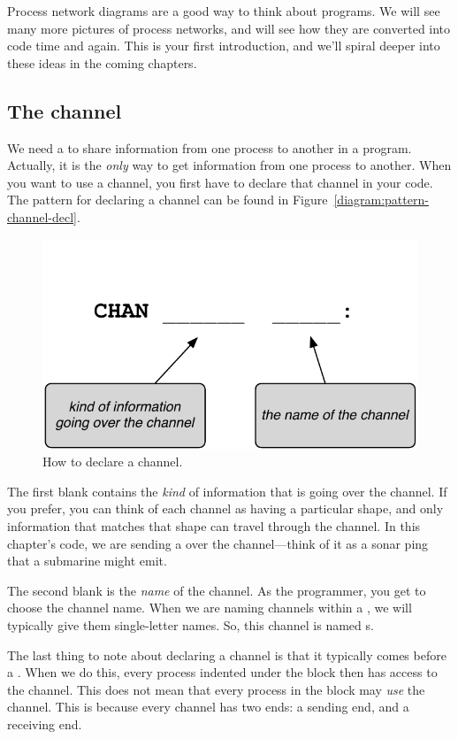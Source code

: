 Process network diagrams are a good way to think about \plumbing programs. We will see many more pictures of process networks, and will see how they are converted into code time and again. This is your first introduction, and we'll spiral deeper into these ideas in the coming chapters.

\subsection{The channel}
We need a \CHANnel to share information from one process to another in a \plumbing program. Actually, it is the {\em only} way to get information from one process to another. When you want to use a channel, you first have to {\strong declare} that channel in your code. The pattern for declaring a channel can be found in Figure~\vref{diagram:pattern-channel-decl}.

\begin{figure}[h]
  \begin{center}
    \includegraphics[width=0.6\linewidth]{images/ch4-pattern-channel-decl}
    \caption{How to declare a channel.}
    \label{diagram:ch4-pattern-channel-decl}
  \end{center}
\end{figure}

The first blank contains the {\em kind} of information that is going over the channel. If you prefer, you can think of each channel as having a particular shape, and only information that matches that shape can travel through the channel. In this chapter's code, we are sending a \SIGNALV over the channel---think of it as a sonar ping that a submarine might emit.

The second blank is the {\em name} of the channel. As the programmer, you get to choose the channel name. When we are naming channels within a \PROC, we will typically give them single-letter names. So, this channel is named {\code s}. 

The last thing to note about declaring a channel is that it typically comes before a \PAR. When we do this, every process indented under the \PARallel block then has access to the channel. This does not mean that every process in the block may {\em use} the channel. This is because every channel has two ends: a sending end, and a receiving end.


